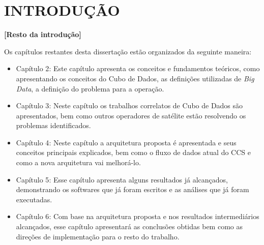 
\chapter{INTRODUÇÃO}

\textbf{[Resto da introdução]}

Os capítulos restantes desta dissertação estão organizados da seguinte maneira:
\begin{itemize}
\item{Capítulo 2}: Este capítulo apresenta os conceitos e fundamentos teóricos, como apresentando os conceitos do Cubo de Dados, as definições utilizadas de \textit{Big Data}, a definição do problema para a operação.
\item{Capítulo 3}: Neste capítulo os trabalhos correlatos de Cubo de Dados são apresentados, bem como outros operadores de satélite estão resolvendo os problemas identificados.
\item{Capítulo 4}: Neste capítulo a arquitetura proposta é apresentada e seus conceitos principais explicados, bem como o fluxo de dados atual do CCS e como a nova arquitetura vai melhorá-lo.
\item{Capítulo 5}: Esse capítulo apresenta alguns resultados já alcançados, demonstrando os softwares que já foram escritos e as análises que já foram executadas.
\item{Capítulo 6}: Com base na arquitetura proposta e nos resultados intermediários alcançados, esse capítulo apresentará as conclusões obtidas bem como as direções de implementação para o resto do trabalho.
\end{itemize}

